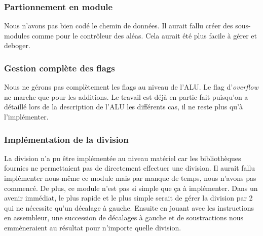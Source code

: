 \subsubsection*{Partionnement en module}

Nous n'avons pas bien codé le chemin de données. Il aurait fallu créer des sous-modules comme pour le contrôleur des aléas. Cela aurait été plus facile à gérer et deboger.

\subsubsection*{Gestion complète des flags}

Nous ne gérons pas complètement les flags au niveau de l'ALU. Le flag d'\textit{overflow} ne marche que pour les additions. Le travail est déjà en partie fait puisqu'on a détaillé lors de la description de l'ALU les différents cas, il ne reste plus qu'à l'implémenter.

\subsubsection*{Implémentation de la division}

La division n'a pu être implémentée au niveau matériel car les bibliothèques fournies ne permettaient pas de directement effectuer une division. Il aurait fallu implémenter nous-même ce module mais par manque de temps, nous n'avons pas commencé. De plus, ce module n'est pas si simple que ça à implémenter. Dans un avenir immédiat, le plus rapide et le plus simple serait de gérer la division par 2 qui ne nécessite qu'un décalage à gauche. Ensuite en jouant avec les instructions en assembleur, une succession de décalages à gauche et de soustractions nous emmèneraient au résultat pour n'importe quelle division.